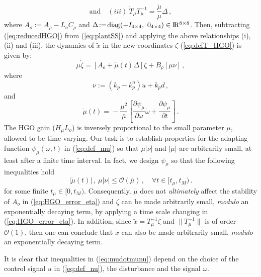 \documentclass[letterpaper, 10 pt, conference]{ieeeconf}  %
\def\re{{\rm I}\! {\rm R}}
\theoremstyle{plain}
\theoremstyle{definition}
\theoremstyle{remark}
\begin{document}
$$\mbox{and} \quad
(iii) \ \dot{T}_\mu T_\mu^{-1}\!=\!\frac{\dot{\mu}}{\mu}
\Delta\,,$$
%
where $A_o\!:=\!A_\rho\!-\!L_o C_\rho$ and
$\Delta\!:=\!\mbox{diag}(-I_{4 \times 4}, \ 0_{4 \times 4}) \in \re^{8 \times 8}$.
%
Then, subtracting (\ref{eq:reducedHGO}) from
(\ref{eq:plantSS}) and applying the above
relationships (i),
(ii) and (iii), the dynamics of $\tilde{x}$ 
in the new coordinates $\zeta$ (\ref{eq:defT_HGO}) is given by:
%
\begin{equation}
\mu \dot{\zeta} = [A_o+ \dot{\mu}(t) \Delta] \zeta + B_\rho [\mu
\nu]\,, \label{eq:HGO_error_eta}
\end{equation}
%
where %
%
\begin{equation}
\nu:=(k_p-k_p^n)u+k_p d\,,\label{eq:def_nu}
\end{equation}
%
and
%
\begin{equation}
\dot{\mu}(t)\!=\!-\frac{\mu^2}{\bar{\mu}} \left[\frac{\partial
\psi_\mu}{\partial \omega} \dot{\omega}+\frac{\partial
\psi_\mu}{\partial t}\right]\,. \label{eq:def_mudot}
\end{equation}
%
The HGO gain ($H_\mu L_o$) is inversely proportional to the small parameter $\mu$,
allowed to be time-varying. %
Our task is to establish properties for the adapting
function $\psi_\mu(\omega,t)$ in (\ref{eq:def_mu}) so that $\mu
|\nu|$ and $|\dot{\mu}|$ are arbitrarily small, at least after a
finite time interval. In fact, we design $\psi_\mu$ so that the following inequalities hold
%
\begin{equation}
|\dot{\mu}(t)|\,, \ \mu |\nu| \leq \mathcal{O}(\bar{\mu})\,, \quad
\forall t \in [t_\mu,t_M)\,. \label{eq:mudotmunu}
\end{equation}
%
for  some finite $t_\mu \in [0,t_M)$.  Consequently, $\dot{\mu}$ does not {\em
ultimately} affect the stability of $A_o$ in
(\ref{eq:HGO_error_eta}) and $\zeta$  can be made
arbitrarily small, {\em modulo} an exponentially decaying term, by applying a time scale changing in (\ref{eq:HGO_error_eta}). In addition, since $\tilde{x} = T_\mu^{-1} \zeta$ and $\|T_\mu^{-1}\|$ is of order $\mathcal{O}(1)$, then one can conclude that $\tilde{x}$ can also be made
arbitrarily small, {\em modulo} an exponentially decaying term.

It is clear that inequalities in (\ref{eq:mudotmunu}) depend on the choice of the control signal $u$ in (\ref{eq:def_nu}), the disturbance and the signal $\omega$. 
\end{document}
